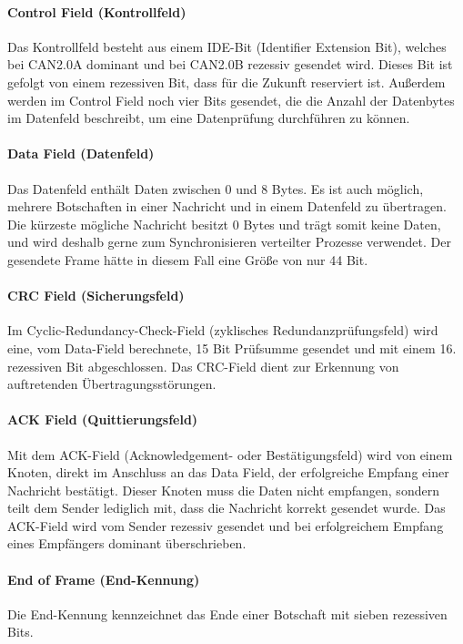             \paragraph{Control Field (Kontrollfeld)}
            Das Kontrollfeld besteht aus einem IDE-Bit (Identifier Extension Bit), welches bei CAN2.0A dominant und bei CAN2.0B rezessiv gesendet wird.
            Dieses Bit ist gefolgt von einem rezessiven Bit, dass für die Zukunft reserviert ist.
            Außerdem werden im Control Field noch vier Bits gesendet, die die Anzahl der Datenbytes im Datenfeld beschreibt, um eine Datenprüfung durchführen zu können.

            \paragraph{Data Field (Datenfeld)}
            Das Datenfeld enthält Daten zwischen 0 und 8 Bytes.
            Es ist auch möglich, mehrere Botschaften in einer Nachricht und in einem Datenfeld zu übertragen.
            Die kürzeste mögliche Nachricht besitzt 0 Bytes und trägt somit keine Daten, und wird deshalb gerne zum Synchronisieren verteilter Prozesse verwendet.
            Der gesendete Frame hätte in diesem Fall eine Größe von nur 44 Bit. 

            \paragraph{CRC Field (Sicherungsfeld)}
            Im Cyclic-Redundancy-Check-Field (zyklisches Redundanzprüfungsfeld) wird eine, vom Data-Field berechnete, 15 Bit Prüfsumme gesendet und mit einem 16. rezessiven Bit abgeschlossen.
            Das CRC-Field dient zur Erkennung von auftretenden Übertragungsstörungen.

            \paragraph{ACK Field (Quittierungsfeld)}
            Mit dem ACK-Field (Acknowledgement- oder Bestätigungsfeld) wird von einem Knoten, direkt im Anschluss an das Data Field, der erfolgreiche Empfang einer Nachricht bestätigt.
            Dieser Knoten muss die Daten nicht empfangen, sondern teilt dem Sender lediglich mit, dass die Nachricht korrekt gesendet wurde.
            Das ACK-Field wird vom Sender rezessiv gesendet und bei erfolgreichem Empfang eines Empfängers dominant überschrieben. 

            \paragraph{End of Frame (End-Kennung)}
            Die End-Kennung kennzeichnet das Ende einer Botschaft mit sieben rezessiven Bits. 

